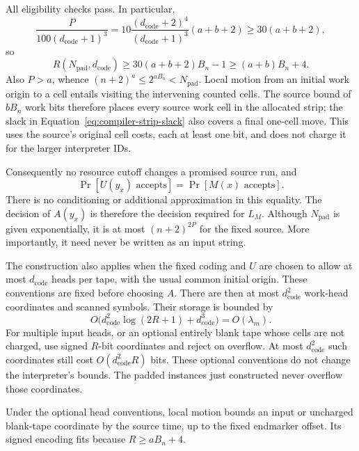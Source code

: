 All eligibility checks pass.  In particular,
\[
 \frac{P}{100(d_{\mathrm{code}}+1)^3}
 =10\frac{(d_{\mathrm{code}}+2)^4}
          {(d_{\mathrm{code}}+1)^3}(a+b+2)
 \ge30(a+b+2),
\]
so
\begin{equation}\label{eq:compiler-strip-slack}
 R(N_{\mathrm{pad}},d_{\mathrm{code}})
 \ge30(a+b+2)B_n-1\ge(a+b)B_n+4.
\end{equation}
Also $P>a$, whence
$(n+2)^a\le2^{aB_n}<N_{\mathrm{pad}}$.
Local motion from an initial work origin to a cell entails visiting
the intervening counted cells.  The source bound of $bB_n$ work bits
therefore places every source work cell in the allocated strip;
the slack in Equation~\eqref{eq:compiler-strip-slack} also covers a final
one-cell move.  This uses the source's original cell costs, each at
least one bit, and does not charge it for the larger interpreter IDs.

Consequently no resource cutoff changes a promised source run, and
\begin{equation}\label{eq:compiler-exact-probability}
 \Pr[U(y_x)\text{ accepts}]=\Pr[M(x)\text{ accepts}].
\end{equation}
There is no conditioning or additional approximation in this equality.
The decision of $A(y_x)$ is therefore the decision required for $L_M$.
Although $N_{\mathrm{pad}}$ is given exponentially, it is at most
$(n+2)^{2P}$ for the fixed source.  More importantly, it need never
be written as an input string.

\begin{remark}
The construction also applies when the fixed coding and $U$ are chosen
to allow at most $d_{\mathrm{code}}$ heads per tape, with the usual common
initial origin. These conventions are fixed before choosing $A$.
There are then at most $d_{\mathrm{code}}^2$ work-head coordinates and
scanned symbols.  Their storage is bounded by
\[
 O\bigl(d_{\mathrm{code}}^2\log(2R+1)
          +d_{\mathrm{code}}^3\bigr)=O(\lambda_m).
\]
For multiple input heads, or an optional entirely blank tape whose
cells are not charged, use signed $R$-bit coordinates and reject on
overflow.  At most $d_{\mathrm{code}}^2$ such coordinates still cost
$O(d_{\mathrm{code}}^2R)$ bits.  These optional conventions do not
change the interpreter's bounds. The padded instances just constructed
never overflow those coordinates.

Under the optional head conventions, local motion bounds an input or
uncharged blank-tape coordinate by the source time, up to the fixed
endmarker offset.  Its signed encoding fits because $R\ge aB_n+4$.
\end{remark}

